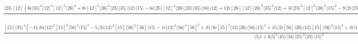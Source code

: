 \documentclass[varwidth, border=5pt]{standalone}
\begin{document}
\begin{my}
$\begin{gathered}
\scriptscriptstyle\frac{\langle23\rangle[12](6i\langle35\rangle^2\langle12\rangle^2[12]^2\langle26\rangle^2+8i[12]^2\langle26\rangle^2\langle23\rangle\langle35\rangle\langle12\rangle\langle15\rangle-6i\langle25\rangle[12]^2\langle26\rangle\langle23\rangle\langle35\rangle\langle16\rangle\langle12\rangle+12i[26][12]\langle26\rangle^3\langle35\rangle^2\langle12\rangle+3i\langle23\rangle^2[12]^2\langle26\rangle^2\langle15\rangle^2-9/2i\langle25\rangle[12]^2\langle26\rangle\langle23\rangle^2\langle16\rangle\langle15\rangle+6i[26][12]\langle26\rangle^2\langle23\rangle^2\langle56\rangle\langle15\rangle+16i[26][12]\langle26\rangle^3\langle23\rangle\langle35\rangle\langle15\rangle+11/6i\langle23\rangle^2[12]^2\langle25\rangle^2\langle16\rangle^2-9/2i[26]\langle25\rangle[12]\langle26\rangle\langle23\rangle^2\langle16\rangle\langle56\rangle-14i[26]\langle25\rangle[12]\langle26\rangle^2\langle23\rangle\langle35\rangle\langle16\rangle+3i\langle23\rangle^2\langle56\rangle^2[26]^2\langle26\rangle^2+8i[26]^2\langle26\rangle^3\langle23\rangle\langle35\rangle\langle56\rangle+6i\langle35\rangle^2[26]^2\langle26\rangle^4)}{\langle2|1+6|2]^3\langle45\rangle\langle34\rangle\langle25\rangle^3\langle12\rangle}+\\
\scriptscriptstyle\frac{[15]\langle35\rangle^4(-11/6i\langle12\rangle^2[15]^2\langle56\rangle^2\langle15\rangle^2-5/2i\langle12\rangle^2[15]\langle56\rangle^3[56]\langle15\rangle-1i\langle12\rangle^2\langle56\rangle^4[56]^2+31/6i[15]^2\langle12\rangle\langle26\rangle\langle56\rangle\langle15\rangle^3+15/2i[56]\langle26\rangle\langle12\rangle[15]\langle56\rangle^2\langle15\rangle^2+3i\langle12\rangle\langle26\rangle\langle56\rangle^3[56]^2\langle15\rangle-13/3i[15]^2\langle26\rangle^2\langle15\rangle^4-7i[15]\langle56\rangle\langle26\rangle^2[56]\langle15\rangle^3-3i\langle56\rangle^2\langle26\rangle^2[56]^2\langle15\rangle^2)}{\langle5|1+6|5]^3\langle45\rangle\langle34\rangle\langle25\rangle^3\langle23\rangle\langle15\rangle^3}\phantom{+}
\end{gathered}$
\end{my}
\end{document}
